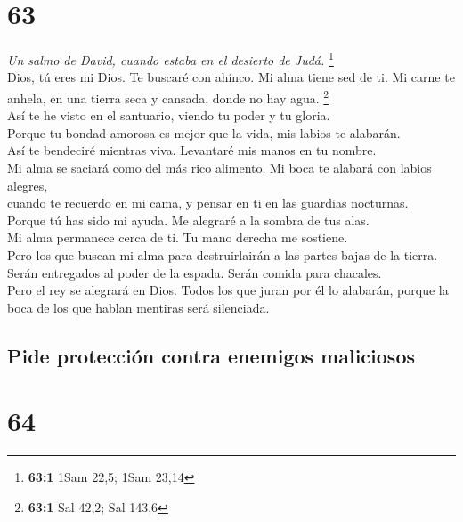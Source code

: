 \hypertarget{section-61}{%
\section{63}\label{section-61}}

\emph{Un salmo de David, cuando estaba en el desierto de Judá.}
\footnote{\textbf{63:1} 1Sam 22,5; 1Sam 23,14}\\
 Dios, tú eres mi Dios. Te buscaré con ahínco. Mi alma
tiene sed de ti. Mi carne te anhela, en una tierra seca y cansada, donde
no hay agua. \footnote{\textbf{63:1} Sal 42,2; Sal 143,6}\\
 Así te he visto en el santuario, viendo tu poder y tu
gloria.\\
 Porque tu bondad amorosa es mejor que la vida, mis labios
te alabarán.\\
 Así te bendeciré mientras viva. Levantaré mis manos en tu
nombre.\\
 Mi alma se saciará como del más rico alimento. Mi boca te
alabará con labios alegres,\\
 cuando te recuerdo en mi cama, y pensar en ti en las
guardias nocturnas.\\
 Porque tú has sido mi ayuda. Me alegraré a la sombra de
tus alas.\\
 Mi alma permanece cerca de ti. Tu mano derecha me
sostiene.\\
 Pero los que buscan mi alma para destruirlairán a las
partes bajas de la tierra.\\
 Serán entregados al poder de la espada. Serán comida
para chacales.\\
 Pero el rey se alegrará en Dios. Todos los que juran por
él lo alabarán, porque la boca de los que hablan mentiras será
silenciada.

\hypertarget{pide-protecciuxf3n-contra-enemigos-maliciosos}{%
\subsection{Pide protección contra enemigos
maliciosos}\label{pide-protecciuxf3n-contra-enemigos-maliciosos}}

\hypertarget{section-62}{%
\section{64}\label{section-62}}

